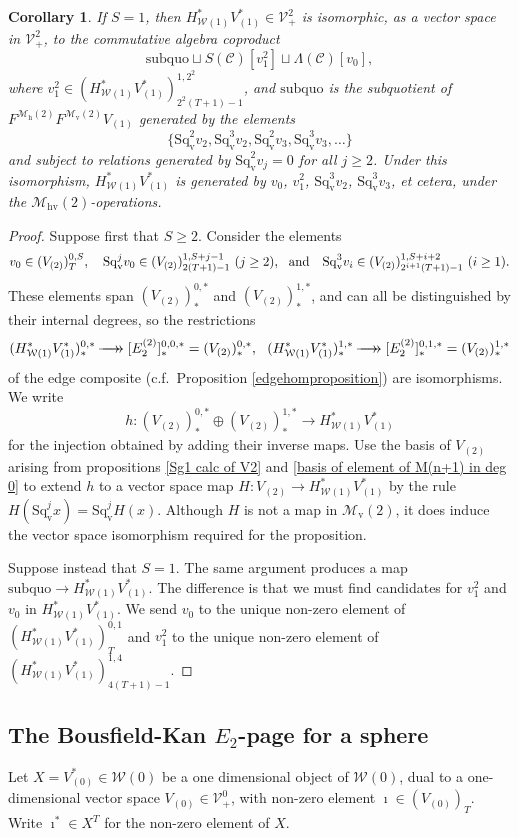 \documentclass[11pt]{amsart} \renewcommand{\baselinestretch}{1.2}
\theoremstyle{plain}
\newtheorem{cor}[thm]{Corollary}
\numberwithin{equation}{section} %
\theoremstyle{plain}
\newtheorem{cor}[thm]{Corollary}
\numberwithin{equation}{chapter} %
\renewcommand{\to}{\longrightarrow}
\newcommand{\scrC}{\mathscr{C}}
\newcommand{\calV}{\mathcal{V}}
\newcommand{\calw}{\mathcal{W}}
\newcommand{\calMv}{\mathcal{M}\dver}
\newcommand{\calMh}{\mathcal{M}\dhor}
\newcommand{\calMhv}{\mathcal{M}_\mathrm{hv}}
\newcommand{\CommOperad}{{\scrC}}
\newcommand{\vect}[2]{\calV^{#1}_{#2}}
\newcommand{\epi}{{\,\makebox[0cm][l]{\ensuremath\to}\to{}}}
\newcommand{\E}[5]{[E^{#1}_{#2}#3]^{#4}_{#5}}
\newcommand{\dver}{_\mathrm{v}}
\newcommand{\dhor}{_\mathrm{h}}
\newcommand{\Sqv}{\mathrm{Sq}\dver}
\newcommand{\SubsectionOrSection}[1]{\subsection{#1}}
\begin{document}
\begin{Calculations of HWn}
\begin{cor}
If $S=1$, then $H^*_{\calw(1)}V^*_{(1)}\in \vect{2}{+}$ is isomorphic, as a vector space in $\vect{2}{+}$, to the commutative algebra coproduct
\[\mathrm{subquo}\sqcup S(\CommOperad) [v_1^{2}]\sqcup \Lambda(\CommOperad)[v_0],\] where $v_1^2\in(H^*_{\calw(1)}V^*_{(1)})^{1,2^2}_{2^2(T+1)-1}$, and $\mathrm{subquo}$ is the subquotient of $F^{\calMh(2)}F^{\calMv(2)}V_{(1)}$ generated by the elements
\[\{\Sqv^2v_{2},\Sqv^3v_{2},\Sqv^2v_{3},\Sqv^3v_{3},\ldots\}\]
and subject to relations generated by 
$\Sqv^2 v_{j}=0$ for all $j\geq2$. Under this isomorphism, $H^*_{\calw(1)}V^*_{(1)}$ is generated by $v_0$, $ v_1^2$, $\Sqv^3 v_2$, $\Sqv^3 v_3$, et cetera, under the $\calMhv(2)$-operations.
\end{cor}
\begin{proof}
Suppose first that $S\geq2$. Consider the elements
\[v_0\in (V_{(2)})^{0,S}_{T},\ \ \ \Sqv^j v_0\in (V_{(2)})^{1,S+j-1}_{2(T+1)-1}\  \textup{($j\geq2$)},\ \ \textup{and}\ \ \ \Sqv^3v_i\in (V_{(2)})^{1,S+i+2}_{2^{i+1}(T+1)-1}\ \textup{($i\geq1$)}.\]
These elements span $(V_{(2)})^{0,*}_*$ and $(V_{(2)})^{1,*}_*$, and can all be distinguished by their internal degrees, so the restrictions 
\[(H^*_{\calw(1)}V^*_{(1)})^{0,*}_*\epi \E{(2)}{2}{}{0,0,*}{*}=(V_{(2)})^{0,*}_*,\ \ (H^*_{\calw(1)}V^*_{(1)})^{1,*}_*\epi \E{(2)}{2}{}{0,1,*}{*}=(V_{(2)})^{1,*}_*\]
 of the edge composite (c.f.\ Proposition \ref{edgehomproposition}) are isomorphisms. We write
\[h:(V_{(2)})^{0,*}_*\oplus (V_{(2)})^{1,*}_*\to H^*_{\calw(1)}V^*_{(1)}\]
for the injection obtained by adding their inverse maps. Use the basis of $V_{(2)}$ arising from propositions \ref{Sg1 calc of V2} and \ref{basis of element of M(n+1) in deg 0} to extend $h$ to a vector space map $H:V_{(2)}\to H^*_{\calw(1)}V^*_{(1)}$ by the rule $H(\Sqv^jx)=\Sqv^j H(x)$. Although $H$ is not a map in $\calMv(2)$, it does induce the vector space isomorphism required for the proposition.

Suppose instead that $S=1$. The same argument produces a map $\mathrm{subquo}\to H^*_{\calw(1)}V^*_{(1)}$. The difference is that we must find candidates for $v_1^2$ and $v_0$ in $H^*_{\calw(1)}V^*_{(1)}$. We send $v_0$ to the unique non-zero element of $(H^*_{\calw(1)}V^*_{(1)})^{0,1}_{T}$ and $v_1^{2}$ to the unique non-zero element of $(H^*_{\calw(1)}V^*_{(1)})^{1,4}_{4(T+1)-1}$.
\end{proof}






\SubsectionOrSection{The Bousfield-Kan $E_2$-page for a sphere}
\label{Calculations of HW0}
Let $X=V^*_{(0)}\in\calw(0)$ be a one dimensional object of $\calw(0)$, dual to a one-dimensional vector space $V_{(0)}\in\vect{0}{+}$, with non-zero element $\imath\in(V_{(0)})_T$. Write $\imath^*\in X^T$ for the non-zero element of $X$.


\end{Calculations of HWn}
\end{document}
